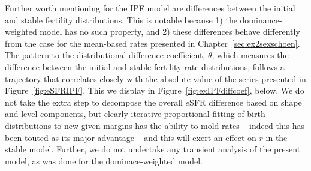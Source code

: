 Further worth mentioning for the IPF model are differences between the initial
and stable fertility distributions. This is notable because 1) the
dominance-weighted model has no such property, and 2) these differences behave
differently from the case for the mean-based rates presented in
Chapter~\ref{sec:ex2sexschoen}. The pattern to the
distributional difference coefficient, $\theta$, which measures the
difference between the initial and stable fertility rate distributions, follows
a trajectory that correlates closely with the absolute value of the series
presented in Figure~\ref{fig:eSFRIPF}. This we display in
Figure~\ref{fig:exIPFdiffcoef}, below. We do not take the extra step to
decompose the overall $e$SFR difference based on shape and level components, but
clearly iterative proportional fitting of birth distributions to new given
margins has the ability to mold rates -- indeed this has been touted as its
major advantage -- and this will exert an effect on $r$ in the stable model.
Further, we do not undertake any transient analysis of the present model, as was
done for the dominace-weighted model.

\FloatBarrier